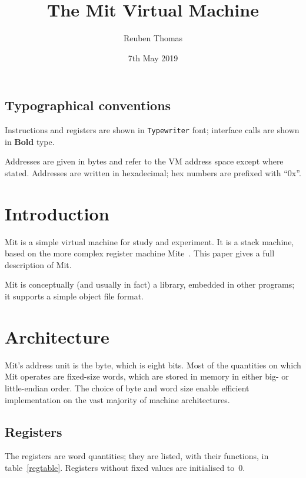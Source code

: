 \documentclass[a4paper]{article}
\title{The Mit Virtual Machine}
\author{Reuben Thomas}
\date{7th May 2019}
\begin{document}
\maketitle

\subsection*{Typographical conventions}

Instructions and registers are shown in {\tt Typewriter} font;
interface calls are shown in {\bf Bold} type.

Addresses are given in bytes and refer to the VM address space except where
stated. Addresses are written in hexadecimal; hex numbers are prefixed with
“0x”.


\section{Introduction}

Mit is a simple virtual machine for study and experiment. It is a stack machine, based on the more complex register machine Mite~\cite{mite0}.
This paper gives a full description of Mit.

Mit is conceptually (and usually in fact) a library, embedded in other programs; it supports a simple object file format.


\section{Architecture}

Mit's address unit is the byte, which is eight bits.
Most of the quantities on which Mit operates are fixed-size words, which are stored in memory in either big- or little-endian order.
The choice of byte and word size enable efficient implementation on the vast majority of machine architectures.


\subsection{Registers}
\label{registers}

The registers are word quantities; they are listed, with their functions, in table~\ref{regtable}. Registers without fixed values are initialised to~$0$.
\end{document}
